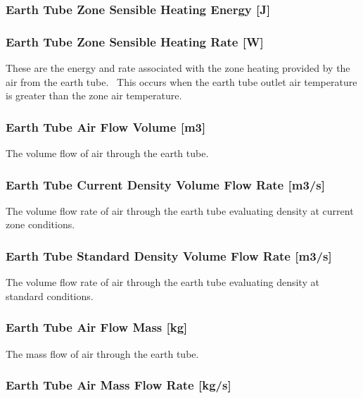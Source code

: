 \subsubsection{Earth Tube Zone Sensible Heating Energy {[}J{]}}\label{earth-tube-zone-sensible-heating-energy-j}

\subsubsection{Earth Tube Zone Sensible Heating Rate {[}W{]}}\label{earth-tube-zone-sensible-heating-rate-w}

These are the energy and rate associated with the zone heating provided by the air from the earth tube.~ This occurs when the earth tube outlet air temperature is greater than the zone air temperature.

\subsubsection{Earth Tube Air Flow Volume {[}m3{]}}\label{earth-tube-air-flow-volume-m3}

The volume flow of air through the earth tube.

\subsubsection{Earth Tube Current Density Volume Flow Rate {[}m3/s{]}}\label{earth-tube-air-current-density-volumetric-flow-rate-m3s}

The volume flow rate of air through the earth tube evaluating density at current zone conditions.

\subsubsection{Earth Tube Standard Density Volume Flow Rate {[}m3/s{]}}\label{earth-tube-air-standard-density-volumetric-flow-rate-m3s}

The volume flow rate of air through the earth tube evaluating density at standard conditions.

\subsubsection{Earth Tube Air Flow Mass {[}kg{]}}\label{earth-tube-air-flow-mass-kg}

The mass flow of air through the earth tube.

\subsubsection{Earth Tube Air Mass Flow Rate {[}kg/s{]}}\label{earth-tube-air-mass-flow-rate-kgs}

